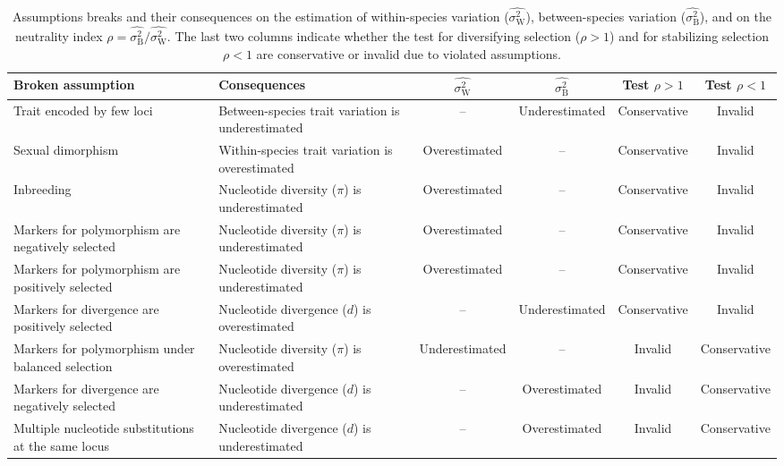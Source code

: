 \documentclass{article}
\newcommand{\RateBetween}{\sigma^2_{\mathrm{B}}}
\newcommand{\RateWhithin}{\sigma^2_{\mathrm{W}}}
\newcommand{\EstRateBetween}{\widehat{\RateBetween}}
\newcommand{\EstRateWhithin}{\widehat{\RateWhithin}}
\newcommand{\NI}{\rho}
\begin{document}
\begin{table}[t!]
    \centering
    \begin{adjustbox}{width = 1.0\textwidth}
        \begin{tabular}{||l|l||c|c||c|c||}
            \hline
            Broken assumption                                       & Consequences                                       & $\EstRateWhithin$   & $\EstRateBetween$   & Test $\NI > 1$ & Test $\NI < 1$ \\ \hline \hline
            Trait encoded by few loci                        & Between-species trait variation is underestimated & --              & Underestimated & Conservative & Invalid  \\ \hline
            Sexual dimorphism                                & Within-species trait variation is overestimated   & Overestimated & -- & Conservative & Invalid  \\ \hline
            Inbreeding                                       & Nucleotide diversity ($\pi$) is underestimated    & Overestimated  & --              & Conservative & Invalid  \\ \hline
            Markers for polymorphism are negatively selected & Nucleotide diversity ($\pi$) is underestimated  & Overestimated & -- & Conservative & Invalid  \\ \hline
            Markers for polymorphism are positively selected & Nucleotide diversity ($\pi$) is underestimated  & Overestimated & -- & Conservative & Invalid  \\ \hline
            Markers for divergence are positively selected   & Nucleotide divergence ($d$) is overestimated & -- & Underestimated & Conservative & Invalid  \\ \hline
            Markers for polymorphism under balanced selection & Nucleotide diversity ($\pi$) is overestimated  & Underestimated & -- & Invalid & Conservative  \\ \hline
            Markers for divergence are negatively selected   & Nucleotide divergence ($d$) is underestimated & -- & Overestimated & Invalid & Conservative  \\ \hline
            Multiple nucleotide substitutions at the same locus & Nucleotide divergence ($d$) is underestimated & -- & Overestimated & Invalid & Conservative  \\\hline \hline
        \end{tabular}
    \end{adjustbox}
    \caption{Assumptions breaks and their consequences on the estimation of within-species variation ($\EstRateWhithin$), between-species variation ($\EstRateBetween$), and on the neutrality index $\NI = \EstRateBetween/\EstRateWhithin$.
    The last two columns indicate whether the test for diversifying selection ($\NI > 1$) and for stabilizing selection $\NI < 1$ are conservative or invalid due to violated assumptions.
    }
    \label{table:assumptions}
\end{table}
\end{document}
